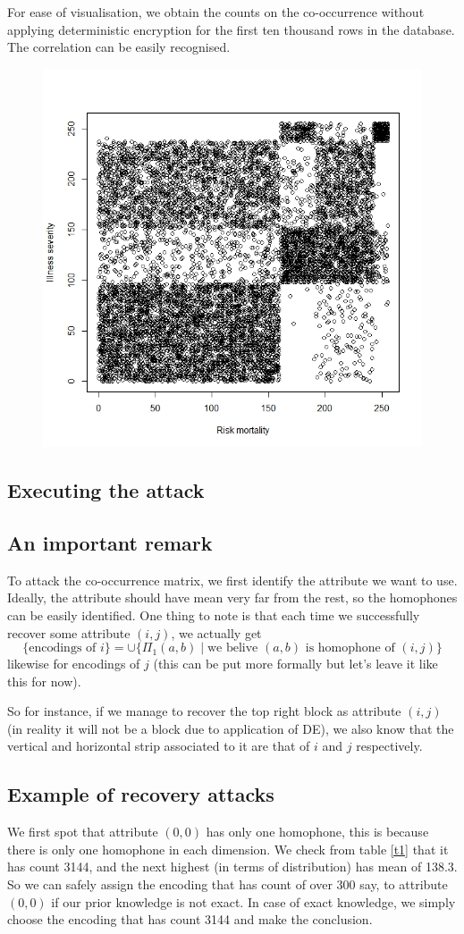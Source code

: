 \documentclass{article}
\begin{document}
For ease of visualisation, we obtain the counts on the co-occurrence without applying deterministic encryption for the first ten thousand rows in the database. The correlation can be easily recognised.
\begin{figure}[H] \label{plot}
	\centering
	\includegraphics[width=0.6\linewidth]{./Img/img3.jpeg}
\end{figure}


\subsection{Executing the attack}
\subsection{An important remark}
To attack the co-occurrence matrix, we first identify the attribute we want to use. Ideally, the attribute should have mean very far from the rest, so the homophones can be easily identified. One thing to note is that each time we successfully recover some attribute $(i,j)$, we actually get
\begin{equation*}
	\{\text{encodings of } i\} = \cup \{ \Pi_{1} (a,b) \mid \text{we belive } (a,b) \text{ is homophone of } (i,j)\}
\end{equation*}
likewise for encodings of $j$ (this can be put more formally but let's leave it like this for now).

So for instance, if we manage to recover the top right block as attribute $(i,j)$ (in reality it will not be a block due to application of DE), we also know that the vertical and horizontal strip associated to it are that of $i$ and $j$ respectively.


\subsection{Example of recovery attacks}
We first spot that attribute $(0,0)$ has only one homophone, this is because there is only one homophone in each dimension. We check from table \ref{t1} that it has count 3144, and the next highest (in terms of distribution) has mean of 138.3. So we can safely assign the encoding that has count of over 300 say, to attribute $(0,0)$ if our prior knowledge is not exact. In case of exact knowledge, we simply choose the encoding that has count 3144 and make the conclusion.
\end{document}
